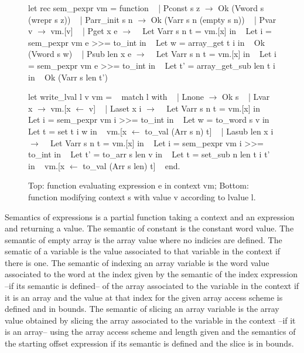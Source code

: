 \documentclass{article}
\begin{document}
\begin{figure}[!t]
\obeylines\obeyspaces\ttfamily%
let rec sem\_pexpr vm = function
~ | Pconst s z \(\rightarrow\) Ok (Vword s (wrepr s z))
~ | Parr\_init s n \(\rightarrow\) Ok (Varr s n (empty s n))
~ | Pvar v \(\rightarrow\) vm.[v]
~ | Pget x e \(\rightarrow\)
~   Let Varr s n t = vm.[x] in
~   Let i = sem\_pexpr vm e >{}>= to\_int in
~   Let w = array\_get t i in
~   Ok (Vword s w)
~ | Psub len x e \(\rightarrow\)
~   Let Varr s n t = vm.[x] in
~   Let i = sem\_pexpr vm e >{}>= to\_int in
~   Let t' = array\_get\_sub len t i in
~   Ok (Varr s len t')

let write\_lval l v vm =
~ match l with
~ | Lnone \(\rightarrow\) Ok s
~ | Lvar x \(\rightarrow\) vm.[x \(\leftarrow\) v]
~ | Laset x i \(\rightarrow\)
~   Let Varr s n t = vm.[x] in
~   Let i = sem\_pexpr vm i >{}>= to\_int in
~   Let w = to\_word s v in
~   Let t = set t i w in
~   vm.[x \(\leftarrow\) to\_val (Arr s n) t]
~ | Lasub len x i \(\rightarrow\)
~   Let Varr s n t = vm.[x] in
~   Let i = sem\_pexpr vm i >{}>= to\_int in
~   Let t' = to\_arr s len v in 
~   Let t = set\_sub n len t i t' in
~   vm.[x \(\leftarrow\) to\_val (Arr s len) t]
~ end.
\normalfont%
\caption{Top: function evaluating expression e in context vm; %
Bottom: function modifying context s with value v according to lvalue l.}
\end{figure}

Semantics of expressions is a partial function taking a context and an
expression and returning a value.
The semantic of constant is the constant word value. The semantic of empty array
is the array value where no indicies are defined. The sematic of a variable is
the value associated to that variable in the context if there is one. The
semantic of indexing an array variable is the word value associated to the word
at the index given by the semantic of the index expression --if its semantic
is defined-- of the array associated to the variable in the context if it is an
array and the value at that index for the given array access scheme is defined
and in bounds. The semantic of slicing an array variable is the array value
obtained by slicing the array associated to the variable in the context --if it
is an array-- using the array access scheme and length given and the semantics
of the starting offset expression if its semantic is defined and the slice is in
bounds.

\smallskip
\end{document}

